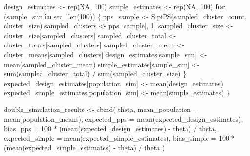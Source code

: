\documentclass[
  spanish,
  11pt,
  letterpaper,
  oneside,
  open=any]{scrbook}
\newenvironment{Shaded}{\begin{snugshade}}{\end{snugshade}}
\newcommand{\AttributeTok}[1]{\textcolor[rgb]{0.40,0.45,0.13}{#1}}
\newcommand{\ConstantTok}[1]{\textcolor[rgb]{0.56,0.35,0.01}{#1}}
\newcommand{\ControlFlowTok}[1]{\textcolor[rgb]{0.00,0.23,0.31}{\textbf{#1}}}
\newcommand{\DecValTok}[1]{\textcolor[rgb]{0.68,0.00,0.00}{#1}}
\newcommand{\FunctionTok}[1]{\textcolor[rgb]{0.28,0.35,0.67}{#1}}
\newcommand{\NormalTok}[1]{\textcolor[rgb]{0.00,0.23,0.31}{#1}}
\newcommand{\OtherTok}[1]{\textcolor[rgb]{0.00,0.23,0.31}{#1}}
\newcommand{\SpecialCharTok}[1]{\textcolor[rgb]{0.37,0.37,0.37}{#1}}
\begin{document}
\begin{Shaded}
\begin{Highlighting}[]
\NormalTok{  design\_estimates }\OtherTok{\textless{}{-}} \FunctionTok{rep}\NormalTok{(}\ConstantTok{NA}\NormalTok{, }\DecValTok{100}\NormalTok{)}
\NormalTok{  simple\_estimates }\OtherTok{\textless{}{-}} \FunctionTok{rep}\NormalTok{(}\ConstantTok{NA}\NormalTok{, }\DecValTok{100}\NormalTok{)}
  \ControlFlowTok{for}\NormalTok{ (sample\_sim }\ControlFlowTok{in} \FunctionTok{seq\_len}\NormalTok{(}\DecValTok{100}\NormalTok{)) \{}
\NormalTok{    pps\_sample }\OtherTok{\textless{}{-}} \FunctionTok{S.piPS}\NormalTok{(sampled\_cluster\_count, cluster\_size)}
\NormalTok{    sampled\_clusters }\OtherTok{\textless{}{-}}\NormalTok{ pps\_sample[, }\DecValTok{1}\NormalTok{]}
\NormalTok{    sampled\_cluster\_size }\OtherTok{\textless{}{-}}\NormalTok{ cluster\_size[sampled\_clusters]}
\NormalTok{    sampled\_cluster\_total }\OtherTok{\textless{}{-}}\NormalTok{ cluster\_totals[sampled\_clusters]}
\NormalTok{    sampled\_cluster\_mean }\OtherTok{\textless{}{-}}\NormalTok{ cluster\_means[sampled\_clusters]}
\NormalTok{    design\_estimates[sample\_sim] }\OtherTok{\textless{}{-}} \FunctionTok{mean}\NormalTok{(sampled\_cluster\_mean)}
\NormalTok{    simple\_estimates[sample\_sim] }\OtherTok{\textless{}{-}}
      \FunctionTok{sum}\NormalTok{(sampled\_cluster\_total) }\SpecialCharTok{/} \FunctionTok{sum}\NormalTok{(sampled\_cluster\_size)}
\NormalTok{  \}}
\NormalTok{  expected\_design\_estimates[population\_sim] }\OtherTok{\textless{}{-}} \FunctionTok{mean}\NormalTok{(design\_estimates)}
\NormalTok{  expected\_simple\_estimates[population\_sim] }\OtherTok{\textless{}{-}} \FunctionTok{mean}\NormalTok{(simple\_estimates)}
\NormalTok{\}}

\NormalTok{double\_simulation\_results }\OtherTok{\textless{}{-}} \FunctionTok{cbind}\NormalTok{(}
\NormalTok{  theta,}
  \AttributeTok{mean\_population =} \FunctionTok{mean}\NormalTok{(population\_means),}
  \AttributeTok{expected\_pps =} \FunctionTok{mean}\NormalTok{(expected\_design\_estimates),}
  \AttributeTok{bias\_pps =} \DecValTok{100} \SpecialCharTok{*}\NormalTok{ (}\FunctionTok{mean}\NormalTok{(expected\_design\_estimates) }\SpecialCharTok{{-}}\NormalTok{ theta) }\SpecialCharTok{/}\NormalTok{ theta,}
  \AttributeTok{expected\_simple =} \FunctionTok{mean}\NormalTok{(expected\_simple\_estimates),}
  \AttributeTok{bias\_simple =} \DecValTok{100} \SpecialCharTok{*}\NormalTok{ (}\FunctionTok{mean}\NormalTok{(expected\_simple\_estimates) }\SpecialCharTok{{-}}\NormalTok{ theta) }\SpecialCharTok{/}\NormalTok{ theta}
\NormalTok{)}
\end{Highlighting}
\end{Shaded}
\end{document}
